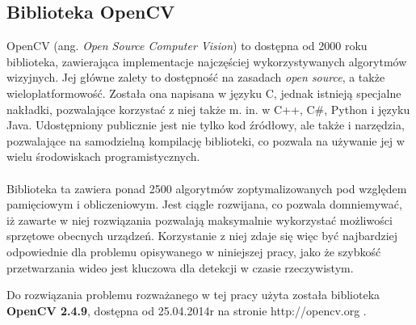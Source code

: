 \subsection{Biblioteka OpenCV}

OpenCV (ang. \textit{Open Source Computer Vision}) to dostępna od 2000 roku biblioteka, zawierająca implementacje najczęściej wykorzystywanych algorytmów wizyjnych. Jej główne zalety to dostępność na zasadach \textit{open source}, a także wieloplatformowość. Została ona napisana w języku C, jednak istnieją specjalne nakładki, pozwalające korzystać z niej także m. in. w C++, C\#, Python i języku Java. Udostępniony publicznie jest nie tylko kod źródłowy, ale także i narzędzia, pozwalające na samodzielną kompilację biblioteki, co pozwala na używanie jej w wielu środowiskach programistycznych.
\paragraph{}
Biblioteka ta zawiera ponad 2500 algorytmów zoptymalizowanych pod względem pamięciowym i obliczeniowym. Jest ciągle rozwijana, co pozwala domniemywać, iż zawarte w niej rozwiązania pozwalają maksymalnie wykorzystać możliwości sprzętowe obecnych urządzeń. Korzystanie z niej zdaje się więc być najbardziej odpowiednie dla problemu opisywanego w niniejszej pracy, jako że szybkość przetwarzania wideo jest kluczowa dla detekcji w czasie rzeczywistym.


Do rozwiązania problemu rozważanego w tej pracy użyta została biblioteka \textbf{OpenCV 2.4.9}, dostępna od 25.04.2014r na stronie http://opencv.org \nocite{OpenCV}.